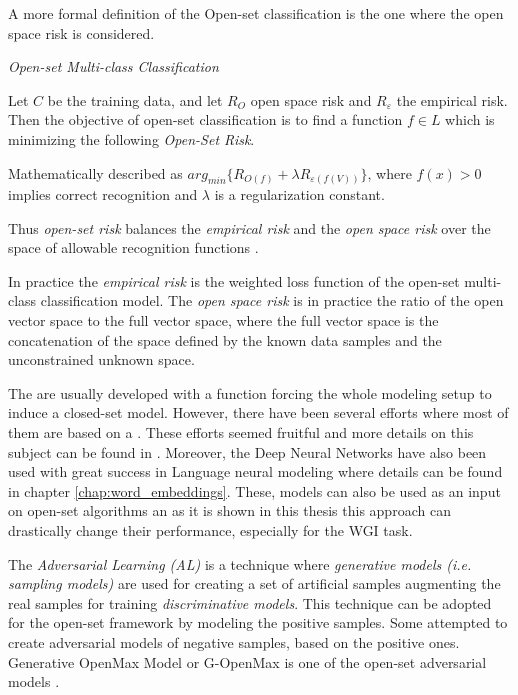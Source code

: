A more formal definition of the Open-set classification is the one where the open space risk is considered.

\begin{definition}{\textit{Open-set Multi-class Classification}}

Let $C$ be the training data, and let $R_{O}$ open space risk and $R_{ε}$ the empirical risk. Then the objective of open-set classification is to find a function $f \in L$ which is minimizing the following \textit{Open-Set Risk}. 

Mathematically described as $arg_{min} \{R_{O(f )} + \lambda R_{ε (f (V ))}\}$, where $f (x) > 0$ implies correct recognition and $\lambda$ is a regularization constant.

Thus \textit{open-set risk} balances the \textit{empirical risk} and the \textit{open space risk} over the space of allowable recognition functions \parencite{geng2018recent}.

\end{definition}

In practice the \textit{empirical risk} is the weighted loss function of the open-set multi-class classification model. The \textit{open space risk} is in practice the ratio of the open vector space to the full vector space, where the full vector space is the concatenation of the space defined by the known data samples and the unconstrained unknown space.

The  are usually developed with a  function forcing the whole modeling setup to induce a closed-set model. However, there have been several efforts where most of them are based on a . These efforts seemed fruitful and more details on this subject can be found in . Moreover, the Deep Neural Networks have also been used with great success in Language neural modeling where details can be found in chapter \ref{chap:word_embeddings}. These, models can also be used as an input on open-set algorithms an as it is shown in this thesis this approach can drastically change their performance, especially for the WGI task.

The \textit{Adversarial Learning (AL)} is a technique where \textit{generative models (i.e. sampling models)} are used for creating a set of artificial samples augmenting the real samples for training \textit{discriminative models}. This technique can be adopted for the open-set framework by modeling the positive samples. Some attempted to create adversarial models of negative samples, based on the positive ones. Generative OpenMax Model or G-OpenMax is one of the open-set adversarial models \parencite{geng2018recent}.

